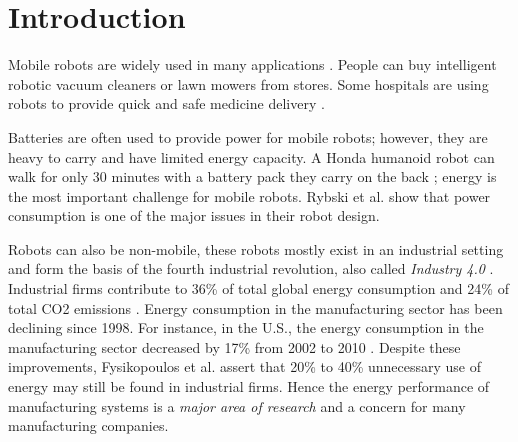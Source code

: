 \section{Introduction}
\label{sec:intro}

Mobile robots are widely used in many applications \cite{mei2005energy_consumers_identified}.
People can buy intelligent robotic vacuum cleaners or lawn mowers from stores. 
Some hospitals are using robots to provide quick and safe medicine delivery \cite{evans1994courier_hospital}.

Batteries are often used to provide power for mobile robots; however, they are heavy to carry and have limited energy capacity. 
A Honda humanoid robot can walk for only 30 minutes with a battery pack they carry on the back \cite{aylett2002machines_to_life}; energy is the most important challenge for mobile robots. 
Rybski et al. \cite{rybsky2000robot_rangers} show that power consumption is one of the major issues in their robot design.

Robots can also be non-mobile, these robots mostly exist in an industrial setting and form the basis of the fourth industrial revolution,
also called \textit{Industry 4.0} \cite{lasi2014industry4}. 
Industrial firms contribute to 36\% of total global energy consumption and 24\% of total CO2 emissions \cite{international2006energy}.
Energy consumption in the manufacturing sector has been declining since 1998. 
For instance, in the U.S., the energy consumption in the manufacturing sector decreased by 17\% from 2002 to 2010 \cite{US2018energy_administration}.
Despite these improvements, Fysikopoulos et al. \cite{fysikopoulos2012automotive_energy_consumption} assert that 20\% to 40\% unnecessary use of energy may still be found in industrial firms. 
Hence the energy performance of manufacturing systems is a \textit{major area of research} and a concern for many manufacturing companies.

